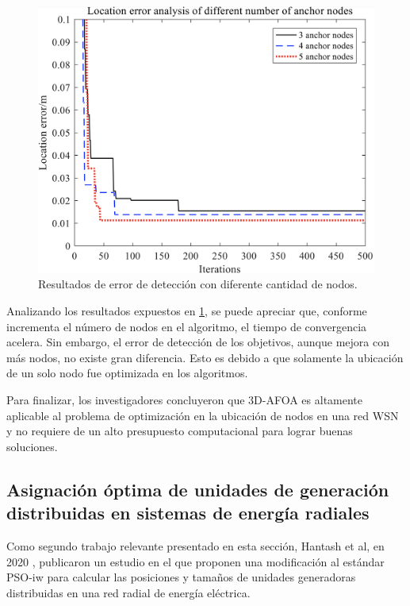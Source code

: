   \begin{figure}[ht!]
    \includegraphics[width=\textwidth]{location-error-3d-afoa_2.png}
    \centering
    \caption{Resultados de error de detección con diferente cantidad de
      nodos.}
    \label{fig:location-error-3d-afoa_2}
    \centering
  \end{figure}

  Analizando los resultados expuestos en \ref{fig:location-error-3d-afoa_2},
  se puede apreciar que, conforme incrementa el número de nodos en el
  algoritmo, el tiempo de convergencia acelera. Sin embargo, el
  error de detección de los objetivos, aunque mejora con más nodos, no existe
  gran diferencia. Esto es debido a que solamente la ubicación de un solo nodo
  fue optimizada en los algoritmos. 

  Para finalizar, los investigadores concluyeron que 3D-AFOA es altamente
  aplicable al problema de optimización en la ubicación de nodos en una red
  WSN y no requiere de un alto presupuesto computacional para lograr buenas
  soluciones. 

\subsection{Asignación óptima de unidades de generación distribuidas en
  sistemas de energía radiales}
  Como segundo trabajo relevante presentado en esta sección, Hantash et al,
  en 2020 \cite{PSOEnergy}, publicaron un estudio en el que
  proponen una modificación al estándar PSO-iw para calcular las posiciones y
  tamaños de unidades generadoras distribuidas en una red radial de energía
  eléctrica. 

